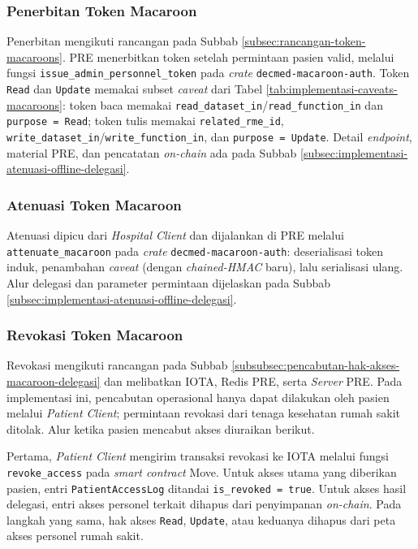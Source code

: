 \subsubsection{Penerbitan Token Macaroon}
\label{subsubsec:penerbitan-awal-token-macaroons}

Penerbitan mengikuti rancangan pada Subbab \ref{subsec:rancangan-token-macaroons}. PRE menerbitkan token setelah permintaan pasien valid, melalui fungsi \texttt{issue\_admin\_personnel\_token} pada \textit{crate} \texttt{decmed-macaroon-auth}. Token \texttt{Read} dan \texttt{Update} memakai subset \textit{caveat} dari Tabel \ref{tab:implementasi-caveats-macaroons}: token baca memakai \texttt{read\_dataset\_in}/\texttt{read\_function\_in} dan \texttt{purpose = Read}; token tulis memakai \texttt{related\_rme\_id}, \texttt{write\_dataset\_in}/\texttt{write\_function\_in}, dan \texttt{purpose = Update}. Detail \textit{endpoint}, material PRE, dan pencatatan \textit{on-chain} ada pada Subbab \ref{subsec:implementasi-atenuasi-offline-delegasi}.

\subsubsection{Atenuasi Token Macaroon}
\label{subsubsec:atenuasi-token-macaroons}

Atenuasi dipicu dari \textit{Hospital Client} dan dijalankan di PRE melalui \texttt{attenuate\_macaroon} pada \textit{crate} \texttt{decmed-macaroon-auth}: deserialisasi token induk, penambahan \textit{caveat} (dengan \textit{chained-HMAC} baru), lalu serialisasi ulang. Alur delegasi dan parameter permintaan dijelaskan pada Subbab \ref{subsec:implementasi-atenuasi-offline-delegasi}.

\subsubsection{Revokasi Token Macaroon}
\label{subsubsec:revokasi-token-macaroons}

Revokasi mengikuti rancangan pada Subbab \ref{subsubsec:pencabutan-hak-akses-macaroon-delegasi} dan melibatkan IOTA, Redis PRE, serta \textit{Server} PRE. Pada implementasi ini, pencabutan operasional hanya dapat dilakukan oleh pasien melalui \textit{Patient Client}; permintaan revokasi dari tenaga kesehatan rumah sakit ditolak. Alur ketika pasien mencabut akses diuraikan berikut.

Pertama, \textit{Patient Client} mengirim transaksi revokasi ke IOTA melalui fungsi \texttt{revoke\_access} pada \textit{smart contract} Move. Untuk akses utama yang diberikan pasien, entri \texttt{PatientAccessLog} ditandai \texttt{is\_revoked = true}. Untuk akses hasil delegasi, entri akses personel terkait dihapus dari penyimpanan \textit{on-chain}. Pada langkah yang sama, hak akses \texttt{Read}, \texttt{Update}, atau keduanya dihapus dari peta akses personel rumah sakit.

